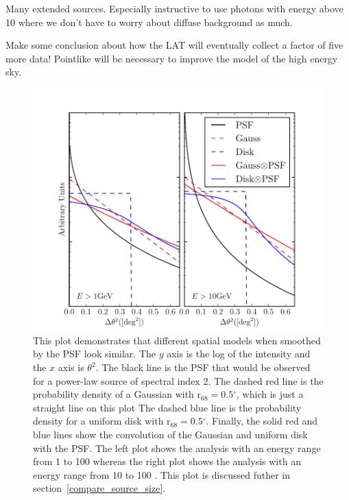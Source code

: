 \documentclass[12pt,preprint]{aastex}
\newcommand{\gev}{\text{GeV}\xspace}
\newcommand{\rsixeight}{{\ensuremath{\text{r}_{68}}}\xspace}
\renewcommand{\deg}{\ensuremath{^\circ}\xspace}
\begin{document}

Many extended sources. Especially instructive to
use photons with energy above 10 \gev where we don't have
to worry about diffuse background as much.

Make some conclusion about how the LAT will eventually collect a factor
of five more data! Pointlike will be necessary to improve the model of the
high energy sky.




\appendix

\begin{figure}
  \begin{center}
    \includegraphics{mc_plots/compare_disk_gauss.pdf}
    \end{center}
    \caption{
    This plot demonstrates that different spatial models when smoothed
    by the PSF look similar.  The $y$ axis is the log of the
    intensity and the $x$ axis is $\theta^2$.  The black line is the
    PSF that would be observed for a power-law source of spectral index
    2. The dashed red line is the probability density of a Gaussian with
    $\rsixeight=0.5\deg$, which is just a straight line on this plot
    The dashed blue line is the probability density for a uniform disk
    with $\rsixeight=0.5\deg$.  Finally, the solid red and blue lines
    show the convolution of the Gaussian and uniform disk with the PSF.
    The left plot shows the analysis with an energy range from 1 \gev to
    100 \gev whereas the right plot shows the analysis with an energy
    range from 10 \gev to 100 \gev.  This plot is discussed futher in
    section~\ref{compare_source_size}.
    }\label{compare_disk_gauss}
  \end{figure}
\end{document}
